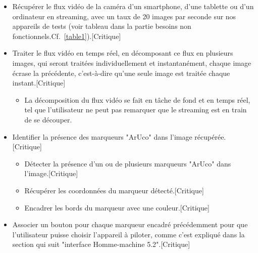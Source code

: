 \documentclass[12pt,a4paper]{article}
\begin{document}
\begin{itemize}
\item Récupérer le flux vidéo de la caméra d'un smartphone, d'une tablette ou d'un ordinateur en streaming, avec un taux de 20 images par seconde sur nos appareils de tests (voir tableau dans la partie besoins non fonctionnels.Cf.~\ref{table1}).[Critique]

\item Traiter le flux vidéo en temps réel, en décomposant ce flux en plusieurs images, qui seront traitées individuellement et instantanément, chaque image écrase la précédente, c'est-à-dire qu'une seule image est traitée chaque instant.[Critique]
\begin{itemize}
  \item La décomposition du flux vidéo se fait en tâche de fond et en temps réel, tel que l'utilisateur ne peut pas remarquer que le streaming est en train de se découper.
  \end{itemize}
\item Identifier la présence des marqueurs "ArUco" dans l'image récupérée.[Critique]
\begin{itemize}
    \item Détecter la présence d'un ou de plusieurs marqueurs "ArUco" dans l'image.[Critique]
    \item Récupérer les coordonnées du marqueur détecté.[Critique]
	\item Encadrer les bords du marqueur avec une couleur.[Critique]
\end{itemize}
\item Associer un bouton pour chaque marqueur encadré précédemment pour que l'utilisateur puisse choisir l'appareil à piloter, comme c'est expliqué dans la section qui suit "interface Homme-machine 5.2".[Critique]
\end{itemize}

\end{document}
